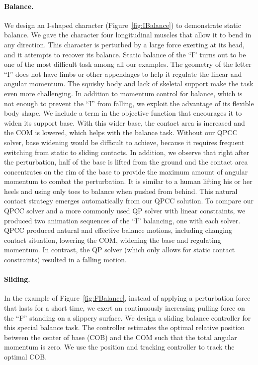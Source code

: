 \paragraph{Balance.} We design an I-shaped character
(Figure~\ref{fig:IBalance}) to demonstrate static balance.  We gave
the character four longitudinal muscles that allow it to bend in any
direction.
This character is perturbed by a large force exerting at
its head, and it attempts to recover its balance. Static balance of
the ``I'' turns out to be one of the most difficult task among all our
examples. The geometry of the letter ``I'' does not have limbs or
other appendages to help it regulate the linear and angular
momentum. The squishy body and lack of skeletal support make the task
even more challenging. In addition to momentum control for balance,
which is not enough to prevent the ``I'' from falling, we exploit the
advantage of its flexible body shape.  We include a term in the
objective function that encourages it to widen its support base.  With
this wider base, the contact area is increased and the COM is lowered,
which helps with the balance task. Without our QPCC solver, base widening would be difficult
to achieve, because it requires frequent switching from static to sliding contacts.
In addition, we observe that right
after the perturbation, half of the base is lifted from the ground and
the contact area concentrates on the rim of the base to provide the maximum
amount of angular momentum to combat the perturbation. It is similar
to a human lifting his or her heels and using only toes to balance
when pushed from behind. This natural contact strategy
emerges automatically from our QPCC solution.  To compare our
QPCC solver and a more commonly used QP solver with linear
constraints, we produced two animation sequences of the ``I''
balancing, one with each solver.  QPCC produced natural and effective
balance motions, including changing contact situation, lowering the
COM, widening the base and regulating momentum. In contrast, the QP
solver (which only allows for static contact constraints) resulted in a falling motion.


\paragraph{Sliding.} In the example of Figure~\ref{fig:FBalance},
instead of applying a perturbation force that lasts for a short time,
we exert an continuously increasing pulling force on the ``F'' standing on
a slippery surface. We design a sliding balance controller for this
special balance task. The controller estimates the optimal relative
position between the center of base (COB) and the COM such that the
total angular momentum is zero. We use the position and tracking controller to track the optimal
COB.

